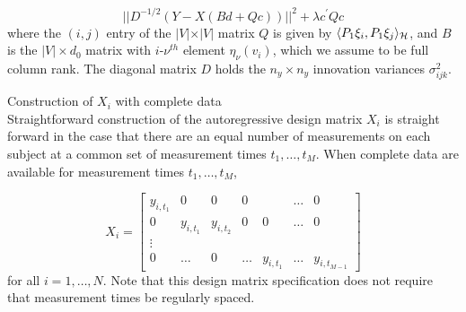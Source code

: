 \begin{equation} \label{eq:ar-design-matrix-1}
\vert \vert D^{-1/2}\left( Y - X \left( Bd + Qc \right) \right) \vert \vert^2  + \lambda c^\prime Q c 
\end{equation}
\noindent
where the $\left(i,j\right)$ entry of the $\vert V \vert \times \vert V \vert$ matrix $Q$ is given by $\langle P_1 \xi_i,  P_1 \xi_j \rangle_{\mathcal{H}}$, and $B$ is the $\vert V \vert \times d_0$ matrix with $i$-$\nu^{th}$ element $\eta_\nu\left(v_i\right)$, which we assume to be full column rank.  The diagonal matrix $D$ holds the $n_y \times n_y$  innovation variances $\sigma^2_{ijk}$. 

\bigskip


\begin{example}{Construction of $X_i$ with complete data}
\\
Straightforward construction of the autoregressive design matrix $X_i$ is straight forward in the case that there are an equal number of measurements on each subject at a common set of measurement times $t_1,\dots, t_M$. When complete data are available for measurement times $t_1, \dots, t_M$, 

\begin{equation}
X_i =  \begin{bmatrix} 
y_{i, t_1} & 0 & 0 &0&& \dots & 0 \\
 0 & y_{i, t_1} &  y_{i, t_2}&0 &0& \dots & 0 \\
 \vdots &&&&&&\\
 0 & \dots &0 & \dots& y_{i,t_1} & \dots &  y_{i, t_{M-1}}
\end{bmatrix}
\end{equation}
\noindent
for all $i = 1,\dots, N$. Note that this design matrix specification does not require that measurement times be regularly spaced.  
\end{example}

